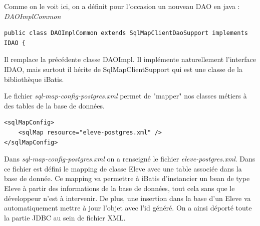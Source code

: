 \documentclass[a4paper,12pt]{article}
\begin{document}
Comme on le voit ici, on a définit pour l'occasion un nouveau DAO en java : \textit{DAOImplCommon}

\begin{lstlisting}
public class DAOImplCommon extends SqlMapClientDaoSupport implements IDAO {
\end{lstlisting}

Il remplace la précédente classe DAOImpl.
Il implémente naturellement l'interface IDAO, mais surtout il hérite de SqlMapClientSupport qui est une classe de la bibliothèque iBatis.


Le fichier  \textit{sql-map-config-postgres.xml} permet de "mapper" nos classes métiers à des tables de la base de données.

\begin{lstlisting}
<sqlMapConfig>
	<sqlMap resource="eleve-postgres.xml" />
</sqlMapConfig>
\end{lstlisting}

Dans \textit{sql-map-config-postgres.xml} on a renseigné le fichier \textit{eleve-postgres.xml}. Dans ce fichier est défini le mapping de classe Eleve avec une table associée dans la base de donnée. Ce mapping va permettre à iBatis d'instancier un bean de type Eleve à partir des informations de la base de données, tout cela sans que le développeur n'est à intervenir. De plus, une insertion dans la base d'un Eleve va automatiquement mettre à jour l'objet avec l'id généré.
On a ainsi déporté toute la partie JDBC au sein de fichier XML.
\end{document}
